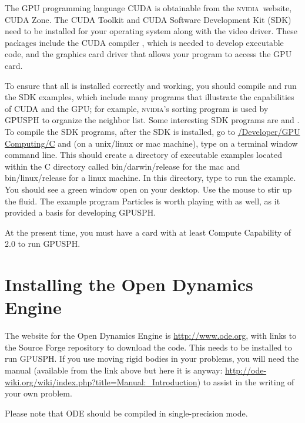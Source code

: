 \documentclass[12pt]{memoir}
\newcommand{\nvidia}{\textsc{nvidia}}
\begin{document}
The GPU programming language CUDA is obtainable from the \nvidia\ website,
CUDA Zone. The CUDA Toolkit and CUDA Software Development Kit (SDK)
need to be installed for your operating system along with the video
driver. These packages include the CUDA compiler , which is
needed to develop executable code, and the graphics card driver that
allows your program to access the GPU card.

To ensure that all is installed correctly and working, you should
compile and run the SDK examples, which include many programs that
illustrate the capabilities of CUDA and the GPU; for example, \nvidia's
sorting program  is used by GPUSPH to organize the
neighbor list. Some interesting SDK programs are  and
. To compile the SDK programs, after the SDK is
installed, go to \url{/Developer/GPU Computing/C} and (on a unix/linux
or mac machine), type  on a terminal window command line. This
should create a directory of executable examples located within the C
directory called bin/darwin/release for the mac and bin/linux/release
for a linux machine. In this directory, type  to run
the  example. You should see a green window open on your
desktop. Use the mouse to stir up the fluid. The example program
Particles is worth playing with as well, as it provided a basis for
developing GPUSPH.

At the present time, you must have a card with at least Compute
Capability of 2.0 to run GPUSPH.


\section{Installing the Open Dynamics Engine}

The website for the Open Dynamics Engine is \url{http://www.ode.org},
with links to the Source Forge repository to download the code. This
needs to be installed to run GPUSPH. If you use moving rigid bodies in
your problems, you will need the manual (available from the link above
but here it is anyway:
\url{http://ode-wiki.org/wiki/index.php?title=Manual:_Introduction}) to
assist in the writing of your own problem.

Please note that ODE should be compiled in single-precision mode.

\end{document}
